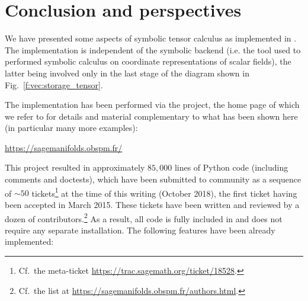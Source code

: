 \chapter{Conclusion and perspectives} \label{s:con}

We have presented some aspects of symbolic tensor calculus as implemented
in \Sage{}. The implementation is independent of the symbolic backend (i.e. the
tool used to performed symbolic calculus on coordinate representations of
scalar fields), the latter being involved only in the last stage of the diagram
shown in Fig.~\ref{f:vec:storage_tensor}.

The implementation has been performed via the 
project, the home page of which we refer to for details and material complementary
to what has been shown here (in particular many more examples):
\begin{center}
\url{https://sagemanifolds.obspm.fr/}
\end{center}
This project resulted in approximately $85,000$ lines of Python code (including comments and doctests), which have been submitted to \Sage{} community as a sequence of
$\sim 50$ tickets\footnote{Cf.\ the meta-ticket \url{https://trac.sagemath.org/ticket/18528}.}
at the time of this writing (October 2018), the
first ticket having been accepted in March 2015.
These tickets have been written and reviewed by a dozen of
contributors.\footnote{Cf.\ the list at \url{https://sagemanifolds.obspm.fr/authors.html}.}
As a result, all code is fully included in  and does not require
any separate installation. The following features have been already implemented:
